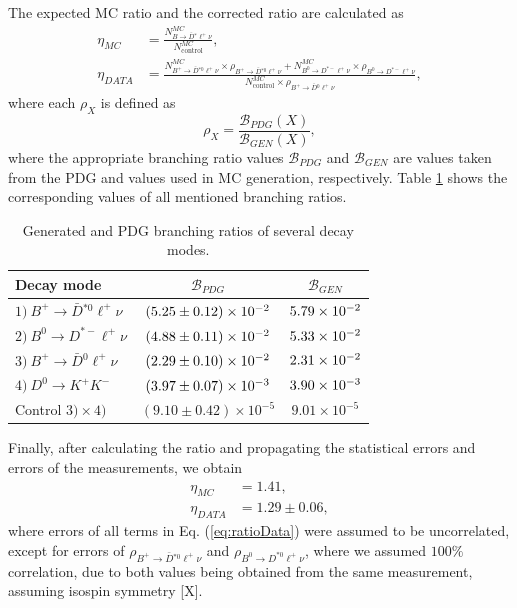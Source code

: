 The expected MC ratio and the corrected ratio are calculated as
\begin{align}
\eta_{MC} &= \frac{N^{MC}_{B \to \bar D {}^* \ell^+ \nu}}{N^{MC}_{\mathrm{control}}},\\
\eta_{DATA} &= \frac{N^{MC}_{B^+ \to \bar D {}^{*0} \ell^+ \nu}\times \rho_{B^+ \to \bar D {}^{*0} \ell^+ \nu} + N^{MC}_{B^0 \to D^{*-} \ell^+ \nu}\times \rho_{B^0 \to D^{*-} \ell^+ \nu}}{N^{MC}_{\mathrm{control}}\times \rho_{B^+ \to \bar D {}^{0} \ell^+ \nu}},
\label{eq:ratioData}
\end{align}
where each $\rho_X$ is defined as 
\begin{equation*}
\rho_X = \frac{\mathcal{B}_{PDG}(X)}{\mathcal{B}_{GEN}(X)},
\end{equation*}
where the appropriate branching ratio values $\mathcal{B}_{PDG}$ and $\mathcal{B}_{GEN}$ are values taken from the PDG \cite{tanabashi2018review} and values used in MC generation, respectively. Table \ref{tab:br} shows the corresponding values of all mentioned branching ratios.

\begin{table}[H]
	\centering
\begin{tabular}{|l|c|c|}
	\hline
	Decay mode & $\mathcal{B}_{PDG}$ & $\mathcal{B}_{GEN}$ \\
	\hline
	$1)~B^+ \to \bar D {}^{*0} \ell^+ \nu$ & $(5.25\pm0.12)\times 10^{-2}$ & $5.79\times 10^{-2}$ \\
	$2)~B^0 \to D^{*-} \ell^+ \nu$ & $(4.88\pm0.11)\times 10^{-2}$ & $5.33\times 10^{-2}$ \\
	$3)~B^+ \to \bar D {}^0 \ell^+ \nu$ & $(2.29\pm0.10)\times 10^{-2}$ & $2.31\times 10^{-2}$ \\
	$4)~D^0 \to K^+ K^-$ & $(3.97\pm0.07)\times 10^{-3}$ & $3.90\times 10^{-3}$ \\
	\hline
	Control $3) \times 4)$ & $(9.10\pm0.42)\times 10^{-5}$ & $9.01\times 10^{-5}$ \\
	\hline
\end{tabular}
	\caption{Generated and PDG branching ratios of several decay modes.}
	\label{tab:br}
\end{table}

Finally, after calculating the ratio and propagating the statistical errors and errors of the measurements, we obtain
\begin{align*}
\eta_{MC} &= 1.41,\\
\eta_{DATA} &= 1.29\pm 0.06,
\end{align*}
where errors of all terms in Eq. (\ref{eq:ratioData}) were assumed to be uncorrelated, except for errors of $\rho_{B^+ \to \bar D {}^{*0} \ell^+ \nu}$ and $\rho_{B^0 \to D^{*0} \ell^+ \nu}$, where we assumed $100\%$ correlation, due to both values being obtained from the same measurement, assuming isospin symmetry [X].

